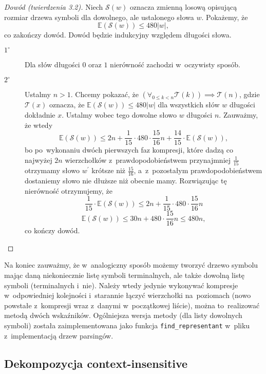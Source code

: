 \documentclass[declaration,shortabstract]{iithesis}
\theoremstyle{definition} \newtheorem{definition}{Definicja}[chapter]
\theoremstyle{plain} \newtheorem{remark}[definition]{Obserwacja}
\theoremstyle{plain} \newtheorem{theorem}[definition]{Twierdzenie}
\theoremstyle{plain} \newtheorem{example}{Przykład}[definition]
\theoremstyle{plain} \newtheorem{lemma}[definition]{Lemat}
\begin{document}
\begin{proof}[Dowód (twierdzenia 3.2)]
    Niech $\mathcal{S}(w)$ oznacza zmienną losową opisującą rozmiar drzewa symboli dla dowolnego, ale ustalonego słowa $w$. Pokażemy, że $$\mathbb{E} (\mathcal{S} (w)) \leq 480|w|,$$ co zakończy dowód. Dowód będzie indukcyjny względem długości słowa.
    \begin{description}
        \item[$1^\circ$] Dla słów długości $0$ oraz $1$ nierówność zachodzi w~oczywisty sposób.
        \item[$2^\circ$] Ustalmy $n > 1$. Chcemy pokazać, że $(\forall_{0 \leq k < n} \mathcal{T}(k)) \implies \mathcal{T}(n)$, gdzie $\mathcal{T}(x)$ oznacza, że $\mathbb{E} (\mathcal{S} (w)) \leq 480|w|$ dla wszystkich słów $w$ długości dokładnie $x$. Ustalmy wobec tego dowolne słowo $w$ długości $n$. Zauważmy, że wtedy $$\mathbb{E}(\mathcal{S}(w)) \leq 2n + \frac{1}{15} \cdot 480 \cdot \frac{15}{16}n + \frac{14}{15} \cdot \mathbb{E}(\mathcal{S}(w)),$$ bo po~wykonaniu dwóch pierwszych faz kompresji, które dadzą co najwyżej $2n$ wierzchołków z~prawdopodobieństwem przynajmniej $\frac{1}{15}$ otrzymamy słowo $w^\prime$ krótsze niż $\frac{15}{16}$, a~z~pozostałym prawdopodobieństwem dostaniemy słowo nie dłuższe niż obecnie mamy. Rozwiązując tę nierówność otrzymujemy, że $$\frac{1}{15} \cdot \mathbb{E}(\mathcal{S}(w)) \leq 2n + \frac{1}{15} \cdot 480 \cdot \frac{15}{16}n$$ $$\mathbb{E}(\mathcal{S}(w)) \leq 30n + 480 \cdot \frac{15}{16} n \leq 480n,$$ co kończy dowód. \qedhere
    \end{description}
\end{proof}

Na koniec zauważmy, że w~analogiczny sposób możemy tworzyć drzewo symbolu mając daną niekoniecznie listę symboli terminalnych, ale także dowolną listę symboli (terminalnych i~nie). Należy wtedy jedynie wykonywać kompresje w~odpowiedniej kolejności i~starannie łączyć wierzchołki na~poziomach (nowo powstałe z~kompresji wraz z~danymi w~początkowej liście), można to~realizować metodą dwóch wskaźników. Ogólniejsza wersja metody (dla listy dowolnych symboli) została zaimplementowana jako funkcja \texttt{find\_representant} w~pliku z~implementacją drzew parsingów.

\subsection{Dekompozycja context-insensitive}
\end{document}
